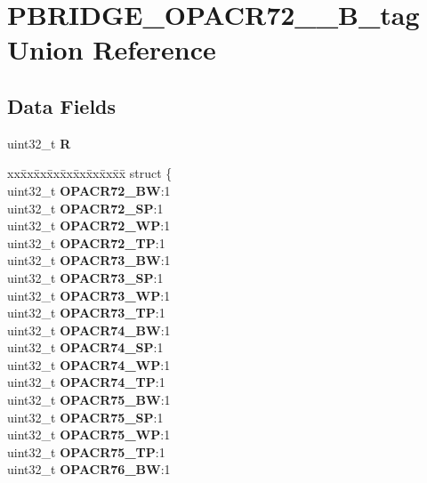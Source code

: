 \hypertarget{unionPBRIDGE__OPACR72__79__32B__tag}{}\section{P\+B\+R\+I\+D\+G\+E\+\_\+\+O\+P\+A\+C\+R72\+\_\+\_\+B\+\_\+tag Union Reference}
\label{unionPBRIDGE__OPACR72__79__32B__tag}
\subsection*{Data Fields}
\begin{DoxyCompactItemize}
\item 
\mbox{\label{unionPBRIDGE__OPACR72__79__32B__tag_ab32e91fc705a348952fd5d8df5c7f47f}} 
uint32\+\_\+t {\bfseries R}
\item 
\mbox{\label{unionPBRIDGE__OPACR72__79__32B__tag_a663b75b895b7d957042f63bdec4cc711}} 
\begin{tabbing}
xx\=xx\=xx\=xx\=xx\=xx\=xx\=xx\=xx\=\kill
struct \{\\
\>uint32\_t {\bfseries OPACR72\_BW}:1\\
\>uint32\_t {\bfseries OPACR72\_SP}:1\\
\>uint32\_t {\bfseries OPACR72\_WP}:1\\
\>uint32\_t {\bfseries OPACR72\_TP}:1\\
\>uint32\_t {\bfseries OPACR73\_BW}:1\\
\>uint32\_t {\bfseries OPACR73\_SP}:1\\
\>uint32\_t {\bfseries OPACR73\_WP}:1\\
\>uint32\_t {\bfseries OPACR73\_TP}:1\\
\>uint32\_t {\bfseries OPACR74\_BW}:1\\
\>uint32\_t {\bfseries OPACR74\_SP}:1\\
\>uint32\_t {\bfseries OPACR74\_WP}:1\\
\>uint32\_t {\bfseries OPACR74\_TP}:1\\
\>uint32\_t {\bfseries OPACR75\_BW}:1\\
\>uint32\_t {\bfseries OPACR75\_SP}:1\\
\>uint32\_t {\bfseries OPACR75\_WP}:1\\
\>uint32\_t {\bfseries OPACR75\_TP}:1\\
\>uint32\_t {\bfseries OPACR76\_BW}:1\\

\end{tabbing}
\end{DoxyCompactItemize}
